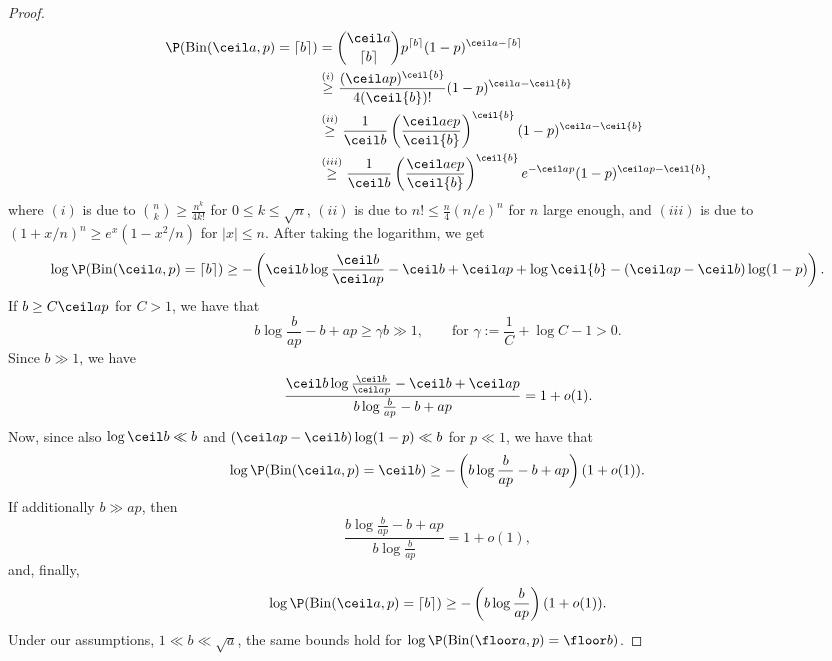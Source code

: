 \begin{proof}
    \begin{align*}
\P(\mathrm{Bin}(\ceil a, p) = \lceil b \rceil) &= {\ceil a \choose \lceil b \rceil} p^{\lceil b \rceil}(1 - p)^{\ceil a - \lceil b \rceil} \\
&\overset{(i)}{\geq} \frac{(\ceil a p)^{  \ceil{b}  }}{4 (  \ceil{b}  )!} (1 - p)^{\ceil a -   \ceil{b}  } \\
&\overset{(ii)}{\geq} \frac{1}{\ceil b} \left(\frac{\ceil a e p}{  \ceil{b}  } \right)^{  \ceil{b}  } (1 - p)^{\ceil a -   \ceil{b}  } \\
&\overset{(iii)}{\geq} \frac{1}{\ceil b} \left(\frac{\ceil a e p}{  \ceil{b}  } \right)^{  \ceil{b}  } e^{-\ceil a p} (1 - p)^{\ceil a p - \ceil{b} },
\end{align*}
where $(i)$ is due to ${n \choose k} \geq \frac{n^k}{4k!}$ for $0 \leq k \leq \sqrt{n}$, $(ii)$ is due to $n! \leq \frac{n}{4}(n/e)^n$ for $n$ large enough, and $(iii)$ is due to $(1 + x/n)^n \geq e^x (1 - x^2/n)$ for $|x|\leq n$.
After taking the logarithm, we get 
\begin{equation*}
    \log \P(\mathrm{Bin}(\ceil a, p) = \lceil b \rceil) \geq - \left(\ceil b \log \frac{\ceil b}{\ceil a  p} - \ceil b + \ceil a p +  \log \ceil{b} - (\ceil a p - \ceil b) \log (1 - p) \right).
\end{equation*}
If \(b \geq C \ceil a p\) for \(C > 1\), we have that 
\begin{equation*}
    b \log \frac{b}{ap} - b + ap \geq \gamma b \gg 1, \qquad \text{for } \gamma := \frac{1}{C} + \log C - 1 > 0.
\end{equation*}
Since \(b \gg 1\), we have
\begin{equation*}
\frac{\ceil b \log \frac{\ceil b}{\ceil a p} - \ceil b + \ceil a p}{ b \log \frac{b}{ap} - b + ap} = 1 + o(1).
\end{equation*}
Now, since also \(\log \ceil b \ll b\) and \((\ceil a p - \ceil b) \log (1 - p) \ll b\) for \(p \ll 1\), we have that
\begin{equation*}
    \log \P(\mathrm{Bin}(\ceil a, p) = \ceil b) \geq - \left(b \log \frac{b}{ap} - b + ap\right)(1 + o(1)).
\end{equation*}
If additionally \(b \gg ap\), then 
\begin{equation*}
    \frac{b \log \frac{b}{ap} - b + ap}{b \log \frac{b}{ap}} = 1 + o(1),
\end{equation*}
and, finally,
\begin{equation*}
    \log \P(\mathrm{Bin}(\ceil a, p) = \lceil b \rceil) \geq - \left(b \log \frac{b}{ap}\right)(1 + o(1)).
\end{equation*}
Under our assumptions, \(1 \ll b \ll \sqrt{a}\), the same bounds hold for \(\log \P(\mathrm{Bin}(\floor a, p) = \floor b)\).
\end{proof}

